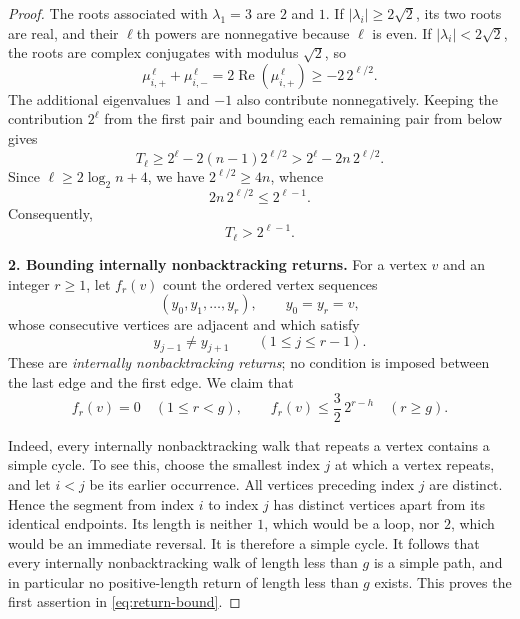 \documentclass[11pt,a4paper]{article}
\begin{document}
\begin{proof}
The roots associated with $\lambda_1=3$ are $2$ and $1$.
If $|\lambda_i|\ge2\sqrt2$, its two roots are real, and their
$\ell$th powers are nonnegative because $\ell$ is even. If
$|\lambda_i|<2\sqrt2$, the roots are complex conjugates with modulus
$\sqrt2$, so
\[
  \mu_{i,+}^{\,\ell}+\mu_{i,-}^{\,\ell}
  =2\operatorname{Re}\!\left(\mu_{i,+}^{\,\ell}\right)
  \ge-2\,2^{\ell/2}.
\]
The additional eigenvalues $1$ and $-1$ also contribute
nonnegatively. Keeping the contribution $2^\ell$ from the first pair
and bounding each remaining pair from below gives
\begin{equation}\label{eq:trace-spectral}
  T_\ell\ge 2^\ell-2(n-1)2^{\ell/2}
  >2^\ell-2n\,2^{\ell/2}.
\end{equation}
Since $\ell\ge2\log_2 n+4$, we have $2^{\ell/2}\ge4n$, whence
\[
  2n\,2^{\ell/2}\le2^{\ell-1}.
\]
Consequently,
\begin{equation}\label{eq:trace-lower}
  T_\ell>2^{\ell-1}.
\end{equation}

\medskip
\noindent\textbf{2. Bounding internally nonbacktracking returns.}
For a vertex $v$ and an integer $r\ge1$, let $f_r(v)$ count the
ordered vertex sequences
\[
  (y_0,y_1,\ldots,y_r),
  \qquad y_0=y_r=v,
\]
whose consecutive vertices are adjacent and which satisfy
\[
  y_{j-1}\ne y_{j+1}\qquad(1\le j\le r-1).
\]
These are \emph{internally nonbacktracking returns}; no condition is
imposed between the last edge and the first edge. We claim that
\begin{equation}\label{eq:return-bound}
  f_r(v)=0\quad(1\le r<g),
  \qquad
  f_r(v)\le\frac32\,2^{r-h}\quad(r\ge g).
\end{equation}

Indeed, every internally nonbacktracking walk that repeats a vertex
contains a simple cycle. To see this, choose the smallest index $j$
at which a vertex repeats, and let $i<j$ be its earlier occurrence.
All vertices preceding index $j$ are distinct. Hence the segment
from index $i$ to index $j$ has distinct vertices apart from its
identical endpoints. Its length is neither $1$, which would be a
loop, nor $2$, which would be an immediate reversal. It is therefore
a simple cycle. It follows that every internally nonbacktracking
walk of length less than $g$ is a simple path, and in particular no
positive-length return of length less than $g$ exists.
This proves the first assertion in \eqref{eq:return-bound}.


\end{proof}
\end{document}
